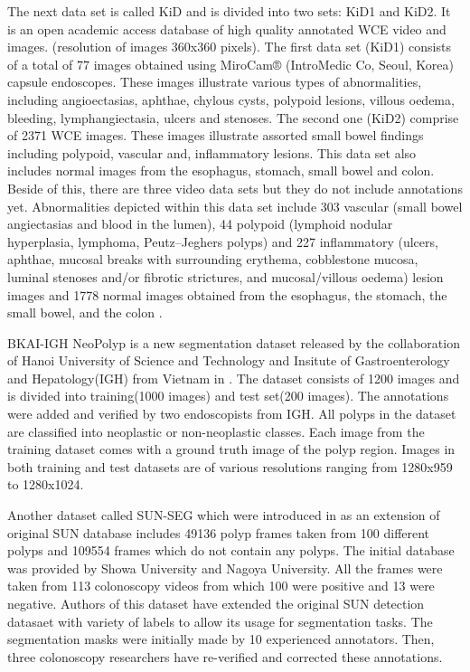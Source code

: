 \documentclass[preprint]{article}
\begin{document}
The next data set is called KiD and is divided into two sets: KiD1 and KiD2. It is an open academic access database of high quality annotated WCE video and images. (resolution of images 360x360 pixels). The first data set (KiD1) consists of a total of 77 images obtained using MiroCam® (IntroMedic Co, Seoul, Korea) capsule endoscopes. These images illustrate various types of abnormalities, including angioectasias, aphthae, chylous cysts, polypoid lesions, villous oedema, bleeding, lymphangiectasia, ulcers and stenoses. The second one (KiD2) comprise of 2371 WCE images. These images illustrate assorted small bowel findings including polypoid, vascular and, inflammatory lesions. This data set also includes normal images from the esophagus, stomach, small bowel and colon. Beside of this, there are three video data sets but they do not include annotations yet. Abnormalities depicted within this data set include 303 vascular (small bowel angiectasias and blood in the lumen), 44 polypoid (lymphoid nodular hyperplasia, lymphoma, Peutz–Jeghers polyps) and 227 inflammatory (ulcers, aphthae, mucosal breaks with surrounding erythema, cobblestone mucosa, luminal stenoses and/or fibrotic strictures, and mucosal/villous oedema) lesion images and 1778 normal images obtained from the esophagus, the stomach, the small bowel, and the colon \cite{kid}.

BKAI-IGH NeoPolyp is a new segmentation dataset released by the collaboration of Hanoi University of Science and Technology and Insitute of Gastroenterology and Hepatology(IGH) from Vietnam in \cite{NeoPolyp}. The dataset consists of 1200 images and is divided into training(1000 images) and test set(200 images). The annotations were added and verified by two endoscopists from IGH. All polyps in the dataset are classified into neoplastic or non-neoplastic classes. Each image from the training dataset comes with a ground truth image of the polyp region. Images in both training and test datasets are of various resolutions ranging from 1280x959 to 1280x1024.

Another dataset called SUN-SEG which were introduced in \cite{SUN-SEG} as an extension of original SUN database includes 49136 polyp frames taken from 100 different polyps and 109554 frames which do not contain any polyps. The initial database was provided by Showa University and Nagoya University. All the frames were taken from 113 colonoscopy videos from which 100 were positive and 13 were negative. Authors of this dataset have extended the original SUN detection datasaet with variety of labels to allow its usage for segmentation tasks. The segmentation masks were initially made by 10 experienced annotators. Then, three colonoscopy researchers have re-verified and corrected these annotations. 
\end{document}

